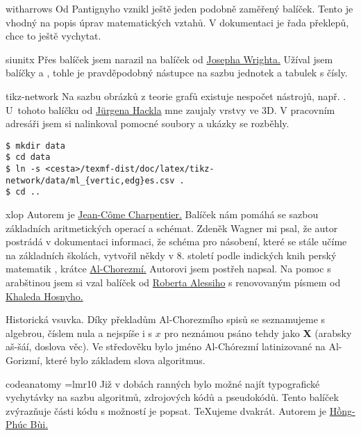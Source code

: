 \pis witharrows
Od Pantignyho vznikl ještě jeden podobně zaměřený balíček. Tento je vhodný na popis úprav matematických vztahů. V dokumentaci je řada překlepů, chce to ještě vychytat.
\kod

\pis siunitx
Přes balíček  jsem narazil na balíček  od
\href{https://ctan.org/author/wright}{Josepha Wrighta.} 
Užíval jsem balíčky  a , tohle je pravděpodobný nástupce na sazbu jednotek a tabulek s čísly.
\kod

\pis tikz-network
Na sazbu obrázků z teorie grafů existuje nespočet nástrojů, např. . U~tohoto balíčku od 
\href{https://ctan.org/author/hackl}{Jürgena Hackla}
mne zaujaly vrstvy ve 3D. V pracovním adresáři jsem si nalinkoval pomocné soubory a ukázky se rozběhly.
\begin{lstlisting}
$ mkdir data
$ cd data
$ ln -s <cesta>/texmf-dist/doc/latex/tikz-network/data/ml_{vertic,edg}es.csv .
$ cd ..
\end{lstlisting}
\kod

\pis xlop
Autorem je
\href{https://ctan.org/author/charpentier}{Jean-Côme Charpentier.}
Balíček nám pomáhá se sazbou základních aritmetických operací a schémat. Zdeněk Wagner mi psal, že autor postrádá v dokumentaci informaci, že schéma pro násobení, které se stále učíme na základních školách, vytvořil někdy v 8. století podle indických knih perský matematik
,
krátce 
\href{https://cs.wikipedia.org/wiki/Al-Chorezm%C3%AD}{Al-Chorezmí.}
Autorovi jsem postřeh napsal. Na pomoc s arabštinou jsem si vzal balíček  od 
\href{https://ctan.org/author/alessi}{Roberta Alessiho} s renovovaným písmem  od 
\href{https://ctan.org/author/hosny}{Khaleda Hosnyho.}

Historická vsuvka. Díky překladům Al-Chorezmího spisů se seznamujeme s algebrou, číslem nula a nejspíše i s $x$ pro neznámou psáno tehdy jako \textbf{\sffamily X} (arabsky \mbox{aš-šáí}, doslova věc). Ve středověku bylo jméno Al-Chórezmí latinizované na \mbox{Al-Gorizmí}, které bylo základem slova algoritmus.
\kod

\pis codeanatomy
\font\malhere=lmr10
Již v dobách ranných bylo možné najít typografické vychytávky na sazbu algoritmů, zdrojových kódů a pseudokódů. Tento balíček zvýrazňuje části kódu s možností je popsat. \TeX ujeme dvakrát.
Autorem je 
\href{https://ctan.org/author/bui}{{\malhere Hồng}-Phúc Bùi.}
\kod

